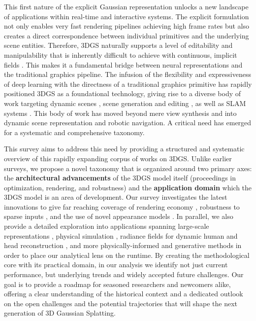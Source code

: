 \documentclass[11pt,a4paper]{article}
\begin{document}
This first nature of the explicit Gaussian representation unlocks a new landscape of applications within real-time and interactive systems. The explicit formulation not only enables very fast rendering pipelines achieving high frame rates \cite{arxiv:2403.13806v1,arxiv:2406.12080v1} but also creates a direct correspondence between individual primitives and the underlying scene entities. Therefore, 3DGS naturally supports a level of editability and manipulability that is inherently difficult to achieve with continuous, implicit fields \cite{arxiv:2403.11868v3,arxiv:2312.00732v1,arxiv:2404.12379v2}. This makes it a fundamental bridge between neural representations and the traditional graphics pipeline. The infusion of the flexibility and expressiveness of deep learning with the directness of a traditional graphics primitive has rapidly positioned 3DGS as a foundational technology, giving rise to a diverse body of work targeting dynamic scenes \cite{arxiv:2310.08528v2,arxiv:2308.09713v1,arxiv:2309.13101v2}, scene generation and editing \cite{arxiv:2309.16585v4,arxiv:2311.14521v4}, as well as SLAM systems \cite{arxiv:2402.13255v2}. This body of work has moved beyond mere view synthesis and into dynamic scene representation and robotic navigation. A critical need has emerged for a systematic and comprehensive taxonomy.

This survey aims to address this need by providing a structured and systematic overview of this rapidly expanding corpus of works on 3DGS. Unlike earlier surveys, we propose a novel taxonomy that is organized around two primary axes: the \textbf{architectural advancements} of the 3DGS model itself (proceedings in optimization, rendering, and robustness) and the \textbf{application domain} which the 3DGS model is an area of development. Our survey investigates the latest innovations to give far reaching coverage of rendering economy \cite{arxiv:2403.14166v1,arxiv:2403.17888v1}, robustness to sparse inputs \cite{arxiv:2403.06912v3}, and the use of novel appearance models \cite{arxiv:2402.15870v1}. In parallel, we also provide a detailed exploration into applications spanning large-scale representations \cite{arxiv:2406.12080v1}, physical simulation \cite{arxiv:2401.15318v1}, radiance fields for dynamic human and head reconstruction \cite{arxiv:2403.05087v1}, and more physically-informed and generative methods \cite{arxiv:2406.10788v1} in order to place our analytical lens on the runtime. By creating the methodological core with its practical domain, in our analysis we identify not just current performance, but underlying trends and widely accepted future challenges. Our goal is to provide a roadmap for seasoned researchers and newcomers alike, offering a clear understanding of the historical context and a dedicated outlook on the open challenges and the potential trajectories that will shape the next generation of 3D Gaussian Splatting.
\end{document}
